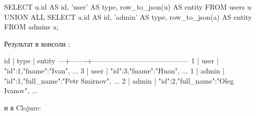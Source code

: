 \begin{english}
  \begin{sql}
SELECT
  u.id AS id,
  'user' AS type,
  row_to_json(u) AS entity
FROM
  users u
UNION ALL
SELECT
  a.id AS id,
  'admin' AS type,
  row_to_json(a) AS entity
FROM
  admins a;
  \end{sql}
\end{english}

Результат в консоли :



\begin{english}
  \begin{text}
id | type  |                 entity
---+-------+-----------------------------------------
 1 | user  | {"id":1,"fname":"Ivan", ...}
 3 | user  | {"id":3,"fname":"Huan", ...}
 1 | admin | {"id":1,"full_name":"Petr Smirnov", ...}
 2 | admin | {"id":2,"full_name":"Oleg Ivanov", ...}
  \end{text}
\end{english}

\noindent
и в Clojure:

\begin{english}
  \begin{clojure}
  \end{clojure}
\end{english}

